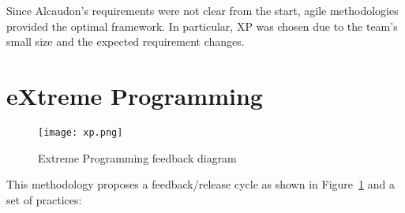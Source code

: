 Since Alcaudon's requirements were not clear from the start, agile methodologies
provided the optimal framework. In particular, \acf{XP} was chosen
due to the team's small size and the expected requirement changes.

\section{eXtreme Programming}

\begin{figure}
  \centering
  \texttt{[image: xp.png]}
  \caption{Extreme Programming feedback diagram\cite{xp}}
  \label{fig:xp}
\end{figure}

This methodology proposes a feedback/release cycle as shown in Figure~\ref{fig:xp} and a set of
practices\cite{xp}:

